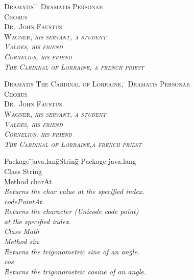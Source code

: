 \documentclass[a4paper, 12pt]{article} %
\begin{document}
\begin{tabbing}
    \scshape Dramatis \= \hspace*{5cm} \=\kill  %
    \scshape Dramatis \=\scshape Personae\\[2mm]
    \> Chorus\\
    \> Dr.~John Faustus \\
    \> Wagner, \>\itshape his servant, a student\\
    \> Valdes, \>\itshape his friend\\
    \> Cornelius, \>\itshape his friend\\
    \> The Cardinal of Lorraine, \>\itshape a french priest
\end{tabbing}

\begin{tabbing}
    \scshape Dramatis \=The Cardinal of Lorraine, \=\kill
    \scshape Dramatis \=\scshape Personae\+\\[2mm] %
    Chorus\\
    Dr.~John Faustus\\
    Wagner, \>\itshape his servant, a student\\
    Valdes, \>\itshape his friend\\
    Cornelius, \>\itshape his friend\\
    The Cardinal of Lorraine,\>\itshape a french priest
\end{tabbing}

\begin{tabbing}
    Package \=\sffamily java.lang\=\sffamily String\=\hspace*{5mm}\=\kill
    Package \>\sffamily java.lang\\
    Class \>\> \sffamily String\\
    Method \>\>\> \sffamily charAt\+\+\+\\
    \>\itshape Returns the char value at the specified index.\\
    \sffamily codePointAt\\
    \>\itshape Returns the character (Unicode code point)\\
    \>\itshape at the specified index.\\
    \<\<\< Class \>\>\sffamily Math\\
    \<\<\< Method \>\>\>\sffamily sin\\
    \>\itshape Returns the trigonometric sine of an angle.\\
    \sffamily cos\\
    \>\itshape Returns the trigonometric cosine of an angle.\\
\end{tabbing}
\end{document}

